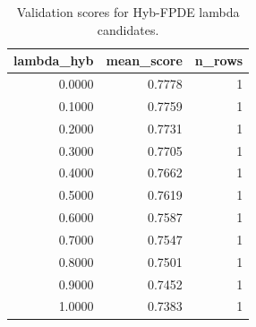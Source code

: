 \begin{table}[t]
\caption{Validation scores for Hyb-FPDE lambda candidates.}
\label{tab:lambda_distribution_computed}
\centering
\begin{tabular}{rrr}
\toprule
lambda\_hyb & mean\_score & n\_rows \\
\midrule
0.0000 & 0.7778 & 1 \\
0.1000 & 0.7759 & 1 \\
0.2000 & 0.7731 & 1 \\
0.3000 & 0.7705 & 1 \\
0.4000 & 0.7662 & 1 \\
0.5000 & 0.7619 & 1 \\
0.6000 & 0.7587 & 1 \\
0.7000 & 0.7547 & 1 \\
0.8000 & 0.7501 & 1 \\
0.9000 & 0.7452 & 1 \\
1.0000 & 0.7383 & 1 \\
\bottomrule
\end{tabular}

\end{table}
